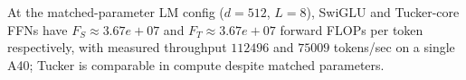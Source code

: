 At the matched-parameter LM config ($d{=}512$, $L{=}8$), SwiGLU and Tucker-core FFNs have $F_S \approx 3.67e+07$ and $F_T \approx 3.67e+07$ forward FLOPs per token respectively, with measured throughput $112496$ and $75009$ tokens/sec on a single A40; Tucker is comparable in compute despite matched parameters.
